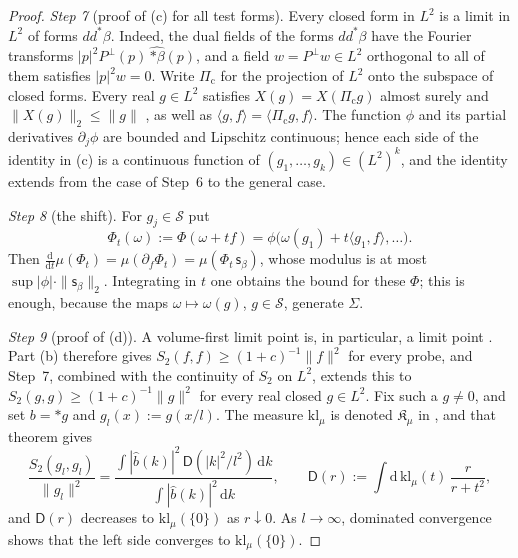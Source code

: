 \documentclass[11pt,letterpaper,reqno]{amsart}
\theoremstyle{definition}
\begin{document}
\begin{proof}
\emph{Step 7} (proof of (c) for all test forms).
Every closed form in $L^2$ is a limit in $L^2$ of forms $dd^*\beta$.
Indeed, the dual fields of the forms $dd^*\beta$ have the Fourier transforms $|p|^2P^\perp(p)\,\widehat{\ast\beta}(p)$, and a field $w=P^\perp w\in L^2$ orthogonal to all of them satisfies $|p|^2w=0$.
Write $\Pi_{\mathrm c}$ for the projection of $L^2$ onto the subspace of closed forms.
Every real $g\in L^2$ satisfies $X(g)=X(\Pi_{\mathrm c}g)$ almost surely and $\|X(g)\|_2\le\|g\|$ \cite[Remark~14.4, Lemma~14.3\,(a)]{QEDII}, as well as $\langle g,f\rangle=\langle\Pi_{\mathrm c}g,f\rangle$.
The function $\phi$ and its partial derivatives $\partial_j\phi$ are bounded and Lipschitz continuous; hence each side of the identity in (c) is a continuous function of $(g_1,\dots,g_k)\in(L^2)^k$, and the identity extends from the case of Step~6 to the general case.

\emph{Step 8} (the shift).
For $g_j\in\mathcal S$ put
\begin{equation*}
\Phi_t(\omega):=\Phi(\omega+tf)=\phi\bigl(\omega(g_1)+t\langle g_1,f\rangle,\dots\bigr).
\end{equation*}
Then $\frac{\mathrm d}{\mathrm dt}\mu(\Phi_t)=\allowbreak \mu(\partial_f\Phi_t)=\allowbreak \mu(\Phi_t\,\allowbreak \mathsf s_\beta)$, whose modulus is at most $\sup|\phi|\cdot\|\mathsf s_\beta\|_2$.
Integrating in $t$ one obtains the bound for these $\Phi$; this is enough, because the maps $\omega\mapsto\omega(g)$, $g\in\mathcal S$, generate $\Sigma$.

\emph{Step 9} (proof of (d)).
A volume-first limit point is, in particular, a limit point \cite[Theorem~1.3\,(a)]{QEDII}.
Part (b) therefore gives $S_2(f,f)\ge(1+c)^{-1}\|f\|^2$ for every probe, and Step~7, combined with the continuity of $S_2$ on $L^2$, extends this to $S_2(g,g)\ge(1+c)^{-1}\|g\|^2$ for every real closed $g\in L^2$.
Fix such a $g\ne0$, and set $b=\ast g$ and $g_l(x):=g(x/l)$.
The measure $\mathrm{kl}_\mu$ is denoted $\mathfrak K_\mu$ in \cite[Theorem~1.4, Part~I\,(d)]{QEDII}, and that theorem gives
\begin{equation*}
\frac{S_2(g_l,g_l)}{\|g_l\|^2}=\frac{\int|\hat b(k)|^2\,\mathsf D(|k|^2/l^2)\,\mathrm dk}{\int|\hat b(k)|^2\,\mathrm dk},\qquad\mathsf D(r):=\int\mathrm d\,\mathrm{kl}_\mu(t)\,\frac{r}{r+t^2},
\end{equation*}
and $\mathsf D(r)$ decreases to $\mathrm{kl}_\mu(\{0\})$ as $r\downarrow0$.
As $l\to\infty$, dominated convergence shows that the left side converges to $\mathrm{kl}_\mu(\{0\})$.
\end{proof}
\end{document}
